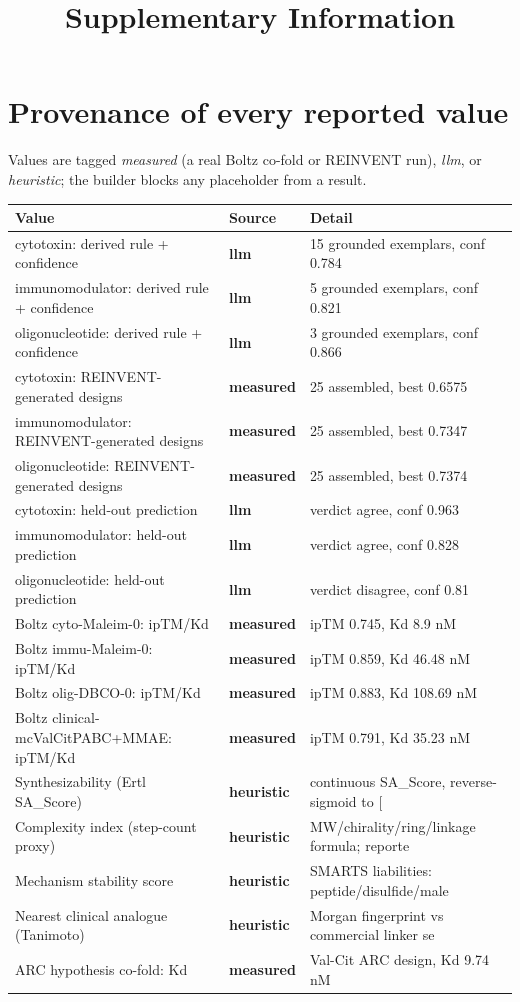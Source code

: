 \documentclass[10pt]{article}
\title{\textbf{Supplementary Information}}
\author{}
\date{}
\begin{document}
\maketitle
\sloppy
\section{Provenance of every reported value}
Values are tagged \emph{measured} (a real Boltz co-fold or REINVENT run), \emph{llm}, or \emph{heuristic}; the builder blocks any placeholder from a result.

\begin{table}[h]\centering\scriptsize\begin{tabular}{l l l}\toprule Value & Source & Detail \\ \midrule cytotoxin: derived rule + confidence & \textbf{llm} & 15 grounded exemplars, conf 0.784 \\
immunomodulator: derived rule + confidence & \textbf{llm} & 5 grounded exemplars, conf 0.821 \\
oligonucleotide: derived rule + confidence & \textbf{llm} & 3 grounded exemplars, conf 0.866 \\
cytotoxin: REINVENT-generated designs & \textbf{measured} & 25 assembled, best 0.6575 \\
immunomodulator: REINVENT-generated designs & \textbf{measured} & 25 assembled, best 0.7347 \\
oligonucleotide: REINVENT-generated designs & \textbf{measured} & 25 assembled, best 0.7374 \\
cytotoxin: held-out prediction & \textbf{llm} & verdict agree, conf 0.963 \\
immunomodulator: held-out prediction & \textbf{llm} & verdict agree, conf 0.828 \\
oligonucleotide: held-out prediction & \textbf{llm} & verdict disagree, conf 0.81 \\
Boltz cyto-Maleim-0: ipTM/Kd & \textbf{measured} & ipTM 0.745, Kd 8.9 nM \\
Boltz immu-Maleim-0: ipTM/Kd & \textbf{measured} & ipTM 0.859, Kd 46.48 nM \\
Boltz olig-DBCO-0: ipTM/Kd & \textbf{measured} & ipTM 0.883, Kd 108.69 nM \\
Boltz clinical-mcValCitPABC+MMAE: ipTM/Kd & \textbf{measured} & ipTM 0.791, Kd 35.23 nM \\
Synthesizability (Ertl SA\_Score) & \textbf{heuristic} & continuous SA\_Score, reverse-sigmoid to [ \\
Complexity index (step-count proxy) & \textbf{heuristic} & MW/chirality/ring/linkage formula; reporte \\
Mechanism stability score & \textbf{heuristic} & SMARTS liabilities: peptide/disulfide/male \\
Nearest clinical analogue (Tanimoto) & \textbf{heuristic} & Morgan fingerprint vs commercial linker se \\
ARC hypothesis co-fold: Kd & \textbf{measured} & Val-Cit ARC design, Kd 9.74 nM \\ \bottomrule\end{tabular}\end{table}
\end{document}
